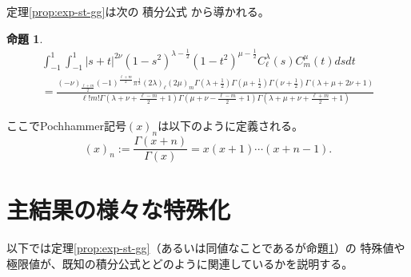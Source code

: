 \documentclass[12pt,a4paper,dvipdfmx]{jsarticle}
\numberwithin{equation}{section}
\theoremstyle{jplain}
\newtheorem{prop}[thm]{命題}
\theoremstyle{remark}
\newtheorem*{remark*}{注意}
\theoremstyle{definition}
\begin{document}
	定理\ref{prop:exp-st-gg}は次の
	積分公式
	から導かれる。
	\begin{prop}
		\label{prop:int-st-gg}
		\begin{multline}
			\int_{- 1}^1 \int_{- 1}^1 | s + t |^{2 \nu} (1 - s^2)^{\lambda - \frac{1}{2}}
			(1 - t^2)^{\mu - \frac{1}{2}} C_\ell^{\lambda} (s) C_m^{\mu} (t) d s d t\\
			=\frac{(- \nu)_{\frac{\ell + m}{2}} (- 1)^{\frac{\ell + m}{2}} \pi^{\frac{1}{2}} (2
			\lambda)_\ell (2 \mu)_m \Gamma \left( \lambda + \frac{1}{2} \right) \Gamma \left(
			\mu + \frac{1}{2} \right) \Gamma \left( \nu + \frac{1}{2} \right) \Gamma
		(\lambda + \mu + 2 \nu + 1)}{\ell!m! \Gamma \left( \lambda + \nu + \frac{\ell -
		m}{2} + 1 \right) \Gamma \left( \mu + \nu - \frac{\ell - m}{2} + 1 \right) \Gamma
		\left( \lambda + \mu + \nu + \frac{\ell + m}{2} + 1 \right)}
			\label{eqn:int-st-gg}
		\end{multline}
	\end{prop}
	ここでPochhammer記号$(x)_n$は以下のように定義される。\begin{equation*}
		(x)_n:=\frac{\Gamma(x+n)}{\Gamma(x)}=x(x+1)\cdots(x+n-1).
	\end{equation*}
\section{主結果の様々な特殊化}
以下では定理\ref{prop:exp-st-gg}（あるいは同値なことであるが命題\ref{prop:int-st-gg}）の
特殊値や極限値が、{既知}の積分公式とどのように関連しているかを説明する。
\end{document}
